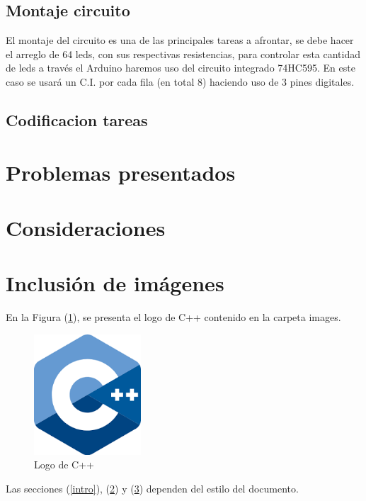 \documentclass{article}
\begin{document}
\subsection{Montaje circuito}
El montaje del circuito es una de las principales tareas a afrontar, se debe hacer el arreglo de 64 leds, con sus respectivas resistencias, para controlar esta cantidad de leds a través el Arduino haremos uso del circuito integrado 74HC595. En este caso se usará un C.I. por cada fila (en total 8) haciendo uso de 3 pines digitales. 


\subsection{Codificacion tareas}

\section{Problemas presentados} \label{contenido}

\section{Consideraciones} \label{contenido}



\section{Inclusión de imágenes} \label{imagenes}

En la Figura (\ref{fig:cpplogo}), se presenta el logo de C++ contenido en la carpeta images.

\begin{figure}[h]
\includegraphics[width=4cm]{cpplogo.png}
\centering
\caption{Logo de C++}
\label{fig:cpplogo}
\end{figure}

Las secciones (\ref{intro}), (\ref{contenido}) y (\ref{imagenes}) dependen del estilo del documento.



\end{document}
